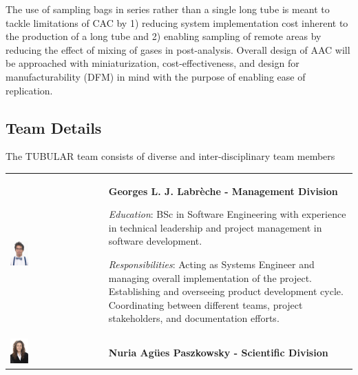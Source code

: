 \documentclass[a4paper,12pt,twoside]{article}
\begin{document}
The use of sampling bags in series rather than a single long tube is meant to tackle limitations of CAC by 1) reducing system implementation cost inherent to the production of a long tube and 2) enabling sampling of remote areas by reducing the effect of mixing of gases in post-analysis. Overall design of AAC will be approached with miniaturization, cost-effectiveness, and design for manufacturability (DFM) in mind with the purpose of enabling ease of replication.
\pagebreak
\subsection{Team Details}
The TUBULAR team consists of diverse and inter-disciplinary team members 

\bigskip


\begin{longtable}[]{m{} m{}}

 \includegraphics[width=0.2\textwidth]{1-introduction/img/georges-louis-joseph-labreche.jpg}  & \textbf{Georges L. J. Labrèche - Management Division}

\smallskip
\textit{Education}: BSc in Software Engineering with experience in technical leadership and project management in software development.

\smallskip
\textit{Responsibilities}: Acting as Systems Engineer and managing overall implementation of the project. Establishing and overseeing product development cycle. Coordinating between different teams, project stakeholders, and documentation efforts.                          
\bigskip
\\

\includegraphics[width=0.2\textwidth]{1-introduction/img/agues-paszkowsky.jpg} & \textbf{Nuria Agües Paszkowsky - Scientific Division}


\end{longtable}
\end{document}
